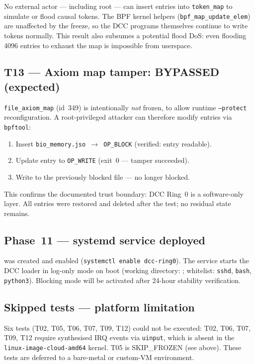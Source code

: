 \documentclass[11pt,a4paper]{article}
\theoremstyle{definition}
\begin{document}
No external actor — including root — can insert entries into \texttt{token\_map}
to simulate or flood causal tokens. The BPF kernel helpers (\texttt{bpf\_map\_update\_elem})
are unaffected by the freeze, so the DCC programs themselves continue to write
tokens normally. This result also subsumes a potential flood DoS: even flooding
4096 entries to exhaust the map is impossible from userspace.

\subsection*{T13 — Axiom map tamper: BYPASSED (expected)}

\texttt{file\_axiom\_map} (id~349) is intentionally \emph{not} frozen, to allow
runtime \texttt{--protect} reconfiguration. A root-privileged attacker can
therefore modify entries via \texttt{bpftool}:

\begin{enumerate}[noitemsep]
  \item Insert \texttt{bio\_memory.jso $\to$ OP\_BLOCK} (verified: entry readable).
  \item Update entry to \texttt{OP\_WRITE} (exit~0 — tamper succeeded).
  \item Write to the previously blocked file — no longer blocked.
\end{enumerate}

This confirms the documented trust boundary: DCC Ring~0 is a software-only layer.
All entries were restored and deleted after the test; no residual state remains.

\subsection*{Phase~11 — systemd service deployed}

 was created and enabled
(\texttt{systemctl enable dcc-ring0}). The service starts the DCC loader in
log-only mode on boot (working directory: ;
whitelist: \texttt{sshd}, \texttt{bash}, \texttt{python3}). Blocking mode
will be activated after 24-hour stability verification.

\subsection*{Skipped tests — platform limitation}

Six tests (T02, T05, T06, T07, T09, T12) could not be executed: T02, T06, T07,
T09, T12 require synthesised IRQ events via \texttt{uinput}, which is absent in
the \texttt{linux-image-cloud-amd64} kernel. T05 is SKIP\_FROZEN (see above).
These tests are deferred to a bare-metal or custom-VM environment.
\end{document}
